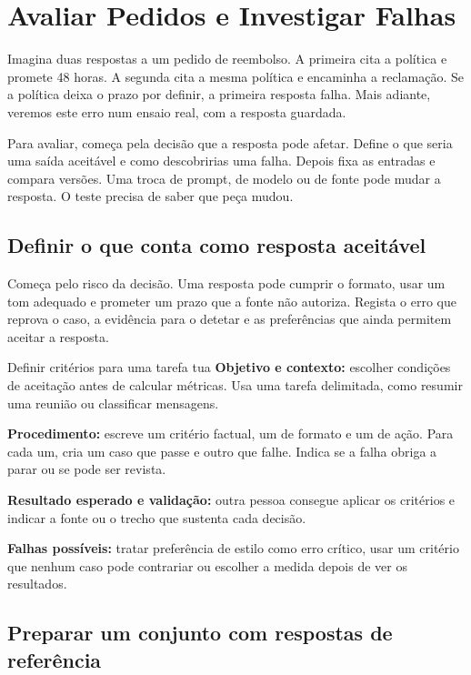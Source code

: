 \chapter{Avaliar Pedidos e Investigar Falhas}
\label{ch:avaliacao}

Imagina duas respostas a um pedido de reembolso. A primeira cita a política e promete 48 horas. A segunda cita a mesma política e encaminha a reclamação. Se a política deixa o prazo por definir, a primeira resposta falha. Mais adiante, veremos este erro num ensaio real, com a resposta guardada.

Para avaliar, começa pela decisão que a resposta pode afetar. Define o que seria uma saída aceitável e como descobririas uma falha. Depois fixa as entradas e compara versões. Uma troca de prompt, de modelo ou de fonte pode mudar a resposta. O teste precisa de saber que peça mudou.

\section{Definir o que conta como resposta aceitável}

Começa pelo risco da decisão. Uma resposta pode cumprir o formato, usar um tom adequado e prometer um prazo que a fonte não autoriza. Regista o erro que reprova o caso, a evidência para o detetar e as preferências que ainda permitem aceitar a resposta.

\begin{promptlabbox}{Definir critérios para uma tarefa tua}
\textbf{Objetivo e contexto:} escolher condições de aceitação antes de calcular métricas. Usa uma tarefa delimitada, como resumir uma reunião ou classificar mensagens.

\textbf{Procedimento:} escreve um critério factual, um de formato e um de ação. Para cada um, cria um caso que passe e outro que falhe. Indica se a falha obriga a parar ou se pode ser revista.

\textbf{Resultado esperado e validação:} outra pessoa consegue aplicar os critérios e indicar a fonte ou o trecho que sustenta cada decisão.

\textbf{Falhas possíveis:} tratar preferência de estilo como erro crítico, usar um critério que nenhum caso pode contrariar ou escolher a medida depois de ver os resultados.
\end{promptlabbox}

\section{Preparar um conjunto com respostas de referência}

